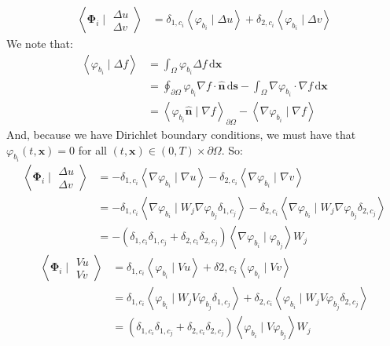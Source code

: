 \documentclass{article}
\newcommand{\bvec}[1]{\boldsymbol{#1}}
\newcommand{\brvec}[1]{\mathbf{#1}}
\newcommand{\dd}{\mathrm{d}}
\begin{document}
\begin{align*}
    \left< \bvec{\Phi}_i \mid \begin{matrix}
        \Delta u \\
        \Delta v
    \end{matrix} \right>
    & = \delta_{1, c_i} \left< \varphi_{b_i} \mid \Delta u \right>
        + \delta_{2, c_i} \left< \varphi_{b_i} \mid \Delta v \right>
\end{align*}
\noindent We note that:
\begin{align*}
    \left< \varphi_{b_i} \mid \Delta f \right>
    & = \int_\Omega \varphi_{b_i} \Delta f \, \dd \bvec{x} \\
    & = \oint_{\partial \Omega} \varphi_{b_i} \nabla f \cdot \hat{\brvec{n}} \, \dd \bvec{s}
        - \int_\Omega \nabla \varphi_{b_i} \cdot \nabla f \, \dd \bvec{x} \\
    & = \left< \varphi_{b_i} \hat{\brvec{n}} \mid \nabla f \right>_{\partial \Omega}
        - \left< \nabla \varphi_{b_i} \mid \nabla f \right>
\end{align*}
\noindent And, because we have Dirichlet boundary conditions,
we must have that $\varphi_{b_i}(t, \bvec{x}) = 0$
for all $(t, \bvec{x}) \in (0, T) \times \partial \Omega$. So:
\begin{align*}
    \left< \bvec{\Phi}_i \mid \begin{matrix}
        \Delta u \\
        \Delta v
    \end{matrix} \right>
    & = -\delta_{1, c_i} \left< \nabla \varphi_{b_i} \mid \nabla u \right>
        - \delta_{2, c_i} \left< \nabla \varphi_{b_i} \mid \nabla v \right> \\
    & = -\delta_{1, c_i} \left< \nabla \varphi_{b_i} \mid W_j \nabla \varphi_{b_j} \delta_{1, c_j} \right>
        - \delta_{2, c_i} \left< \nabla \varphi_{b_i} \mid W_j \nabla \varphi_{b_j} \delta_{2, c_j} \right> \\
    & = -(\delta_{1, c_i} \delta_{1, c_j} + \delta_{2, c_i} \delta_{2, c_j})
        \left< \nabla \varphi_{b_i} \mid \varphi_{b_j} \right> W_j
\end{align*}
\begin{align*}
    \left< \bvec{\Phi}_i \mid \begin{matrix}
        V u \\
        V v
    \end{matrix} \right>
    & = \delta_{1, c_i} \left< \varphi_{b_i} \mid V u \right>
        + \delta{2, c_i} \left< \varphi_{b_i} \mid V v \right> \\
    & = \delta_{1, c_i} \left< \varphi_{b_i} \mid W_j V \varphi_{b_j} \delta_{1, c_j} \right>
        + \delta_{2, c_i} \left< \varphi_{b_i} \mid W_j V \varphi_{b_j} \delta_{2, c_j} \right> \\
    & = (\delta_{1, c_i} \delta_{1, c_j} + \delta_{2, c_i} \delta_{2, c_j})
        \left< \varphi_{b_i} \mid V \varphi_{b_j} \right> W_j
\end{align*}
\end{document}
